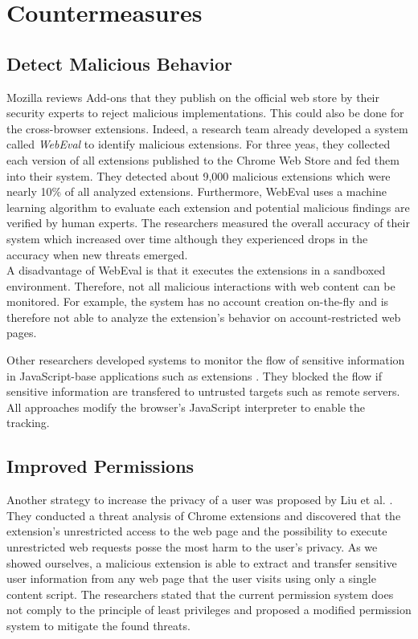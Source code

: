 
\chapter{Countermeasures}


\section{Detect Malicious Behavior}
	
	Mozilla reviews Add-ons that they publish on the official web store by their security experts to reject malicious implementations. This could also be done for the cross-browser extensions. Indeed, a research team already developed a system called \textit{WebEval} to identify malicious extensions. For three yeas, they collected each version of all extensions published to the Chrome Web Store and fed them into their system. They detected about 9,000 malicious extensions which were nearly 10\% of all analyzed extensions. Furthermore, WebEval uses a machine learning algorithm to evaluate each extension and potential malicious findings are verified by human experts. The researchers measured the overall accuracy of their system which increased over time although they experienced drops in the accuracy when new threats emerged. \\
	A disadvantage of WebEval is that it executes the extensions in a sandboxed environment. Therefore, not all malicious interactions with web content can be monitored. For example, the system has no account creation on-the-fly and is therefore not able to analyze the extension's behavior on account-restricted web pages.
	
	Other researchers developed systems to monitor the flow of sensitive information in JavaScript-base applications such as extensions \cite{Dhawan:2009:AIF:1723192.1723250, Hallaraker:2005:DMJ:1078029.1078861, cs2015sentinel,ndss2007xss}. They blocked the flow if sensitive information are transfered to untrusted targets such as remote servers. All approaches modify the browser's JavaScript interpreter to enable the tracking.

\section{Improved Permissions}

	Another strategy to increase the privacy of a user was proposed by Liu et al. \cite{Liu12chromeextensions:}. They conducted a threat analysis of Chrome extensions and discovered that the extension's unrestricted access to the web page and the possibility to execute unrestricted web requests posse the most harm to the user's privacy. As we showed ourselves, a malicious extension is able to extract and transfer sensitive user information from any web page that the user visits using only a single content script. The researchers stated that the current permission system does not comply to the principle of least privileges and proposed a modified permission system to mitigate the found threats. 
	

